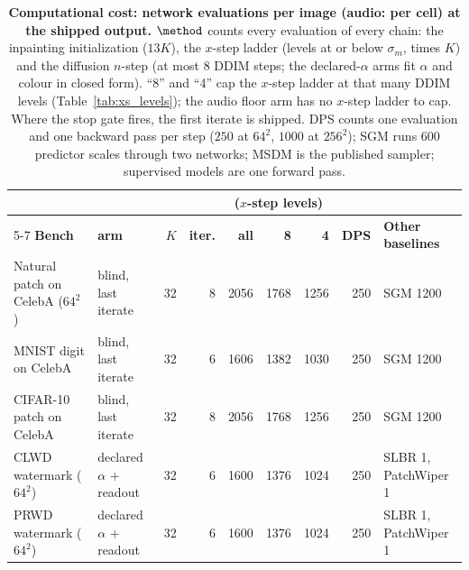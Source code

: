 \begin{table}[t]
    \centering
    \caption{
    \textbf{Computational cost: network evaluations per image (audio: per cell) at the shipped output.}
    $\method$ counts every evaluation of every chain: the inpainting initialization ($13K$),
    the $x$-step ladder (levels at or below $\sigma_m$, times $K$) and the diffusion $n$-step
    (at most $8$ DDIM steps; the declared-$\alpha$ arms fit $\alpha$ and colour in closed form).
    ``8'' and ``4'' cap the $x$-step ladder at that many DDIM levels (Table~\ref{tab:xs_levels});
    the audio floor arm has no $x$-step ladder to cap.
    Where the stop gate fires, the first iterate is shipped.
    DPS counts one evaluation and one backward pass per step ($250$ at $64^2$, $1000$ at $256^2$);
    SGM runs $600$ predictor scales through two networks; MSDM is the published sampler;
    supervised models are one forward pass.
    }
    \label{tab:nfe}
    \small
    \setlength{\tabcolsep}{4pt}
    \begin{tabular}{@{}llrrrrrrl@{}}
        \toprule
        & & & & \multicolumn{3}{c}{\textbf{\method{}} ($x$-step levels)} & & \\
        \cmidrule(lr){5-7}
        \textbf{Bench} & \textbf{\method{} arm} & $K$ & \textbf{iter.} & \textbf{all} & \textbf{8} & \textbf{4} & \textbf{DPS} & \textbf{Other baselines} \\
        \midrule
        Natural patch on CelebA ($64^2$) & blind, last iterate & 32 & 8 & 2056 & 1768 & 1256 & 250 & SGM 1200 \\
        MNIST digit on CelebA & blind, last iterate & 32 & 6 & 1606 & 1382 & 1030 & 250 & SGM 1200 \\
        CIFAR-10 patch on CelebA & blind, last iterate & 32 & 8 & 2056 & 1768 & 1256 & 250 & SGM 1200 \\
        \midrule
        CLWD watermark ($64^2$) & declared $\alpha$ + readout & 32 & 6 & 1600 & 1376 & 1024 & 250 & SLBR 1, PatchWiper 1 \\
        PRWD watermark ($64^2$) & declared $\alpha$ + readout & 32 & 6 & 1600 & 1376 & 1024 & 250 & SLBR 1, PatchWiper 1 \\

\end{tabular}
\end{table}
